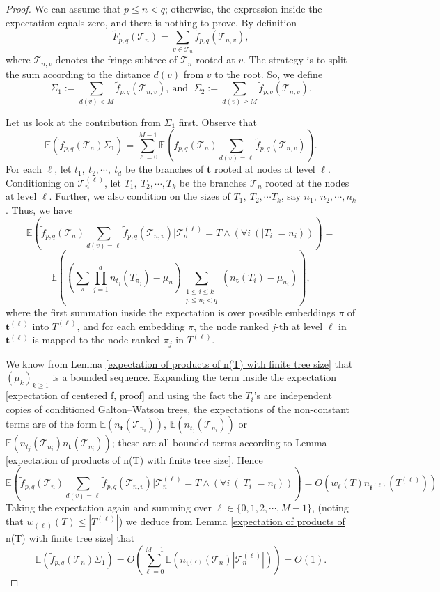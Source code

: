 \documentclass[article]{amsart}
\newcommand{\tc}{\mathcal{T}}
\newcommand{\st}{\textbf{t}}
\newcommand{\n}{n_{\st}}
\newcommand{\hf}{\tilde{f}_{p,q}}
\newcommand{\hF}{\tilde{F}_{p,q}}
\newcommand{\E}{\mathbb{E}}
\theoremstyle{definition}
\theoremstyle{remark}
\begin{document}
\begin{proof}
We can assume that \( p \leq n < q \); otherwise, the expression inside the expectation equals zero, and there is nothing to prove.  By definition
\[
\hF(\tc_n)=\sum_{v\in\tc_n}\hf(\tc_{n,v}),
\]
where $\tc_{n,v}$ denotes the fringe subtree of $\tc_n$ rooted at $v$. The strategy is to split the sum according to the distance $d(v)$ from $v$ to the root. So, we define
	\[
		\Sigma_1 := \sum_{d(v)<M}\hf(\tc_{n,v}), \ \text{and }\  \Sigma_2 := \sum_{d(v)\geq M}\hf(\tc_{n,v}).
	\]
 
Let us look at the contribution from $\Sigma_1$ first. Observe that
\[
\E\left(\hf(\tc_n)\Sigma_1\right) = \sum_{\ell=0}^{M-1}\mathbb{E}\left(\hf(\tc_n)\sum_{d(v)=\ell}\hf(\tc_{n,v})\right).
\]
For each $\ell$, let $t_1, \ t_2, \cdots, \ t_d $ be the branches of $\st$ rooted at nodes at level $\ell$. Conditioning on $\tc_n^{(\ell)}$, let $T_1,\ T_2, \cdots ,T_k$ be the branches $\tc_n$ rooted at the nodes at level $\ell$. Further, we also condition on the sizes of $T_1,\ T_2, \cdots T_k$, say $n_1,\ n_2, \cdots , n_k$. Thus, we have
\[
\mathbb{E}\left(\hf(\tc_n)\sum_{d(v)=\ell}\hf(\tc_{n,v})\Big|\tc_n^{(\ell)}=T \wedge (\forall i \  (|T_i|=n_i)) \right)=
\]
\begin{equation}\label{expectation of centered f, proof}
    \E\left(\left(\sum_{\pi}\prod_{j=1}^{d}n_{t_j}(T_{\pi_j})-\mu_n\right)\sum_{\substack{1\leq i\leq k\\ p\leq n_i <q}}\left(\n(T_i)-\mu_{n_i}\right)\right),
\end{equation}
where the first summation inside the expectation is over possible embeddings $\pi$ of $\st^{(\ell)}$ into $T^{(\ell)}$, and for each embedding $\pi$, the node ranked $j$-th at level $\ell$ in $\st^{(\ell)}$ is mapped to the node ranked $\pi_j$ in $T^{(\ell)}$.

We know from Lemma \ref{expectation of products of n(T) with finite tree size} that $(\mu_k)_{k\geq 1}$ is a bounded sequence.  Expanding the term inside the expectation \eqref{expectation of centered f, proof} and using the fact the $T_i$'s are independent copies of conditioned Galton--Watson trees, the expectations of the non-constant terms are of the form $\E(\n(\tc_{n_i}))$,  $\E(n_{t_j}(\tc_{n_i}))$ or $\E(n_{t_j}(\tc_{n_i})\n(\tc_{n_i}))$; these are all bounded terms according to Lemma \ref{expectation of products of n(T) with finite tree size}. Hence
\[
   \mathbb{E}\left(\hf(\tc_n)\sum_{d(v)=\ell}\hf(\tc_{n,v})\Big|\tc_n^{(\ell)}=T \wedge (\forall i \  (|T_i|=n_i))\right)=O\left(w_{\ell}(T)n_{\st^{(\ell)}}(T^{(\ell)})\right)
\]
Taking the expectation again and summing over $\ell\in \{0,1,2,\cdots, M-1\}$, (noting that $w_{(\ell)}(T)\leq |T^{(\ell)}|$) we deduce from Lemma \ref{expectation of products of n(T) with finite tree size} that 
\[
\E\left(\hf(\tc_n)\Sigma_1\right)=O\left(\sum_{\ell=0}^{M-1}\E\left(n_{\st^{(\ell)}}(\tc_n)|\tc_n^{(\ell)}|\right)\right)=O(1).
\]


\end{proof}
\end{document}
